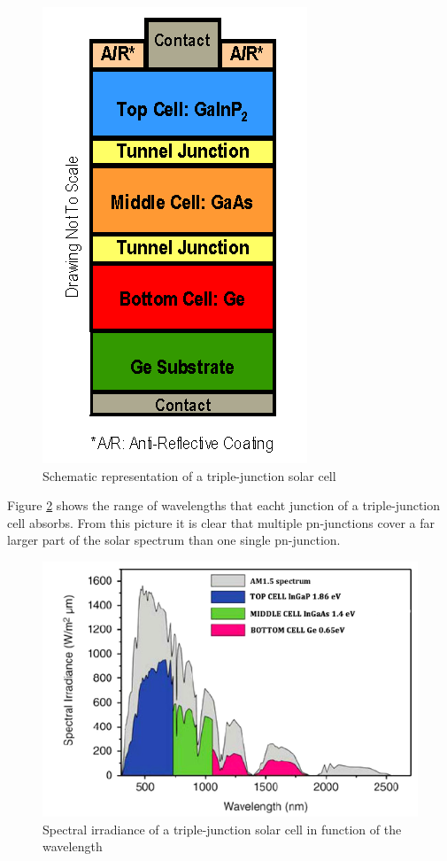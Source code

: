 \begin{figure}[H]
\centering
\includegraphics[height=0.4\textheight]{chapters/img/multijunction_solar_cell.png}
\caption{Schematic representation of a triple-junction solar cell}
\label{fig:multij_cell}
\end{figure}

Figure \ref{multi_irradiance} \cite{yastrebova} shows the range of wavelengths that eacht junction of a triple-junction cell absorbs. From this picture it is clear that multiple pn-junctions cover a far larger part of the solar spectrum than one single pn-junction.

\begin{figure}[H]
\centering
\includegraphics[height=0.4\textheight]{chapters/img/multijunction_spectral_irradiance.png}
\caption{Spectral irradiance of a triple-junction solar cell in function of the wavelength}
\label{multi_irradiance}
\end{figure}

